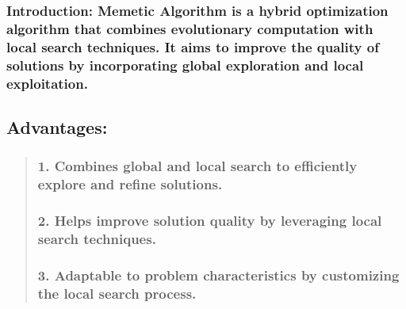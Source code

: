 \documentclass[11pt]{article}
\begin{document}
\hypertarget{introduction-memetic-algorithm-is-a-hybrid-optimization-algorithm-that-combines-evolutionary-computation-with-local-search-techniques.-it-aims-to-improve-the-quality-of-solutions-by-incorporating-global-exploration-and-local-exploitation.}{%
\subsubsection{\texorpdfstring{ Introduction: Memetic Algorithm is a
hybrid optimization algorithm that combines evolutionary computation
with local search techniques. It aims to improve the quality of
solutions by incorporating global exploration and local
exploitation.}{  Introduction: Memetic Algorithm is a hybrid optimization algorithm that combines evolutionary computation with local search techniques. It aims to improve the quality of solutions by incorporating global exploration and local exploitation.}}\label{introduction-memetic-algorithm-is-a-hybrid-optimization-algorithm-that-combines-evolutionary-computation-with-local-search-techniques.-it-aims-to-improve-the-quality-of-solutions-by-incorporating-global-exploration-and-local-exploitation.}}

\hypertarget{advantages}{%
\subsection{\texorpdfstring{
Advantages:}{  Advantages:}}\label{advantages}}

\begin{quote}
\hypertarget{combines-global-and-local-search-to-efficiently-explore-and-refine-solutions.}{%
\subsubsection{\texorpdfstring{ 1. Combines global and local search to
efficiently explore and refine
solutions.}{  1. Combines global and local search to efficiently explore and refine solutions.}}\label{combines-global-and-local-search-to-efficiently-explore-and-refine-solutions.}}

\hypertarget{helps-improve-solution-quality-by-leveraging-local-search-techniques.}{%
\subsubsection{\texorpdfstring{ 2. Helps improve solution quality by
leveraging local search
techniques.}{  2. Helps improve solution quality by leveraging local search techniques.}}\label{helps-improve-solution-quality-by-leveraging-local-search-techniques.}}

\hypertarget{adaptable-to-problem-characteristics-by-customizing-the-local-search-process.}{%
\subsubsection{\texorpdfstring{ 3. Adaptable to problem characteristics
by customizing the local search
process.}{  3. Adaptable to problem characteristics by customizing the local search process.}}\label{adaptable-to-problem-characteristics-by-customizing-the-local-search-process.}}
\end{quote}
\end{document}
